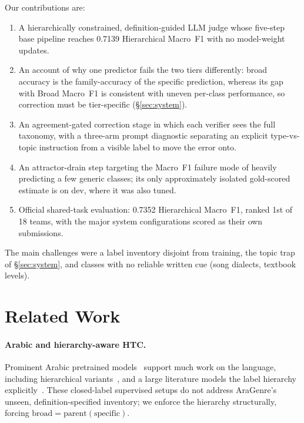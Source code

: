 \documentclass[11pt]{article}
\begin{document}
Our contributions are:
\begin{enumerate}
\itemsep0em
\item A hierarchically constrained, definition-guided LLM judge whose five-step base pipeline reaches 0.7139
Hierarchical Macro~F1 with no model-weight updates.
\item An account of why one predictor fails the two tiers differently: broad accuracy is the
family-accuracy of the specific prediction, whereas its gap with Broad Macro~F1 is consistent
with uneven per-class performance, so correction must be tier-specific (\S\ref{sec:system}).
\item An agreement-gated correction stage in which each verifier sees the full taxonomy, with a
three-arm prompt diagnostic separating an explicit type-vs-topic instruction from a visible
label to move the error onto.
\item An attractor-drain step targeting the Macro~F1 failure mode of heavily predicting a few
generic classes; its only approximately isolated gold-scored estimate is on dev, where it was
also tuned.
\item Official shared-task evaluation: 0.7352 Hierarchical Macro~F1, ranked 1st of 18 teams,
with the major system configurations scored as their own submissions.
\end{enumerate}

\noindent The main challenges were a label inventory disjoint from training, the topic trap of
\S\ref{sec:system}, and classes with no reliable written cue (song dialects, textbook levels).

\section{Related Work}
\paragraph{Arabic and hierarchy-aware HTC.} Prominent Arabic pretrained models~\citep{antoun2020arabert,antoun2021aragpt2}
support much work on the language, including hierarchical variants~\citep{aragpt2htc2025,arabichtc2026}, and a large
literature models the label hierarchy explicitly~\citep{zhu2023hitin,cai2023hpt,zeng2025cpm,wang2025hierclassifier,combining2025,consistencyreg2025,htcsurvey2024}.
These closed-label supervised setups do not address AraGenre's unseen, definition-specified
inventory; we enforce the hierarchy structurally, forcing
$\text{broad}=\text{parent}(\text{specific})$.
\end{document}
